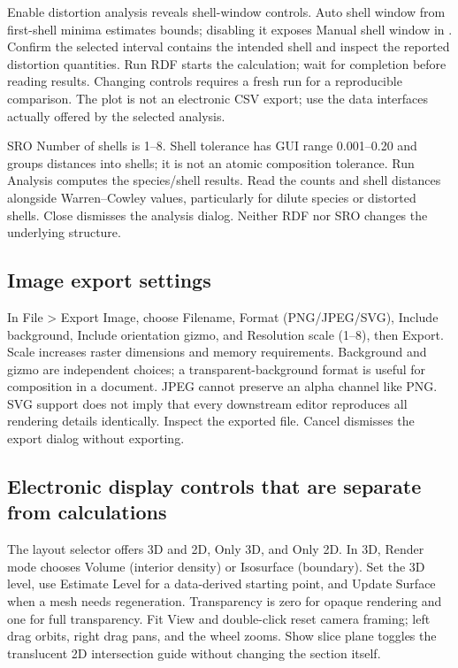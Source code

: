 Enable distortion analysis reveals shell-window controls. Auto shell window from first-shell minima estimates bounds; disabling it exposes Manual shell window in \angstrom. Confirm the selected interval contains the intended shell and inspect the reported distortion quantities. Run RDF starts the calculation; wait for completion before reading results. Changing controls requires a fresh run for a reproducible comparison. The plot is not an electronic CSV export; use the data interfaces actually offered by the selected analysis.

SRO Number of shells is 1--8. Shell tolerance has GUI range 0.001--0.20 and groups distances into shells; it is not an atomic composition tolerance. Run Analysis computes the species/shell results. Read the counts and shell distances alongside Warren--Cowley values, particularly for dilute species or distorted shells. Close dismisses the analysis dialog. Neither RDF nor SRO changes the underlying structure.

\subsection{Image export settings}
In File > Export Image, choose Filename, Format (PNG/JPEG/SVG), Include background, Include orientation gizmo, and Resolution scale (1--8), then Export. Scale increases raster dimensions and memory requirements. Background and gizmo are independent choices; a transparent-background format is useful for composition in a document. JPEG cannot preserve an alpha channel like PNG. SVG support does not imply that every downstream editor reproduces all rendering details identically. Inspect the exported file. Cancel dismisses the export dialog without exporting.

\subsection{Electronic display controls that are separate from calculations}
The layout selector offers 3D and 2D, Only 3D, and Only 2D. In 3D, Render mode chooses Volume (interior density) or Isosurface (boundary). Set the 3D level, use Estimate Level for a data-derived starting point, and Update Surface when a mesh needs regeneration. Transparency is zero for opaque rendering and one for full transparency. Fit View and double-click reset camera framing; left drag orbits, right drag pans, and the wheel zooms. Show slice plane toggles the translucent 2D intersection guide without changing the section itself.

